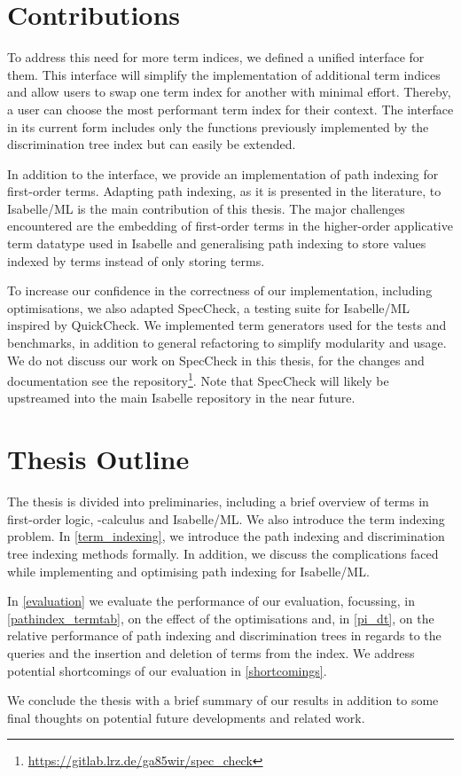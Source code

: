 \section{Contributions}
To address this need for more term indices, we defined a unified interface for them. This interface will simplify the implementation of additional term indices and allow users to swap one term index for another with minimal effort. Thereby, a user can choose the most performant term index for their context.
The interface in its current form includes only the functions previously implemented by the discrimination tree index but can easily be extended.

In addition to the interface, we provide an implementation of path indexing for first-order terms. Adapting path indexing, as it is presented in the literature, to Isabelle/ML is the main contribution of this thesis. The major challenges encountered are the embedding of first-order terms in the higher-order applicative term datatype used in Isabelle and generalising path indexing to store values indexed by terms instead of only storing terms.

To increase our confidence in the correctness of our implementation, including optimisations, we also adapted SpecCheck, a testing suite for Isabelle/ML inspired by QuickCheck. We implemented term generators used for the tests and benchmarks, in addition to general refactoring to simplify modularity and usage. We do not discuss our work on SpecCheck in this thesis, for the changes and documentation see the repository\footnote{\url{https://gitlab.lrz.de/ga85wir/spec_check}}. Note that SpecCheck will likely be upstreamed into the main Isabelle repository in the near future.

\section{Thesis Outline}
The thesis is divided into preliminaries, including a brief overview of terms in first-order logic, \lam -calculus and Isabelle/ML. We also introduce the term indexing problem. In \cref{term_indexing}, we introduce the path indexing and discrimination tree indexing methods formally. In addition, we discuss the complications faced while implementing and optimising path indexing for Isabelle/ML.

In \cref{evaluation} we evaluate the performance of our evaluation, focussing, in \cref{pathindex_termtab}, on the effect of the optimisations and, in \cref{pi_dt}, on the relative performance of path indexing and discrimination trees in regards to the queries and the insertion and deletion of terms from the index. We address potential shortcomings of our evaluation in \cref{shortcomings}.

We conclude the thesis with a brief summary of our results in addition to some final thoughts on potential future developments and related work.
